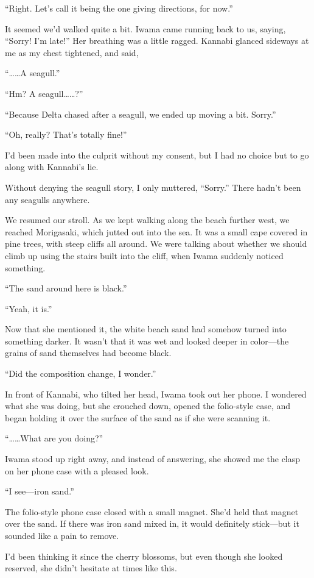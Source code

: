 \documentclass[
    a4paper,
    12pt,
    twoside,
    openany,
    UTF8,
    fontset=windows
]{ctexbook}
\begin{document}
``Right. Let's call it being the one giving directions, for now.''

It seemed we'd walked quite a bit. Iwama came running back to us, saying, ``Sorry! I'm late!'' Her breathing was a little ragged. Kannabi glanced sideways at me as my chest tightened, and said,

``\dots\dots A seagull.''

``Hm? A seagull\dots\dots?''

``Because Delta chased after a seagull, we ended up moving a bit. Sorry.''

``Oh, really? That's totally fine!''

I'd been made into the culprit without my consent, but I had no choice but to go along with Kannabi's lie.

Without denying the seagull story, I only muttered, ``Sorry.'' There hadn't been any seagulls anywhere.

We resumed our stroll. As we kept walking along the beach further west, we reached Morigasaki, which jutted out into the sea. It was a small cape covered in pine trees, with steep cliffs all around. We were talking about whether we should climb up using the stairs built into the cliff, when Iwama suddenly noticed something.

``The sand around here is black.''

``Yeah, it is.''

Now that she mentioned it, the white beach sand had somehow turned into something darker. It wasn't that it was wet and looked deeper in color---the grains of sand themselves had become black.

``Did the composition change, I wonder.''

In front of Kannabi, who tilted her head, Iwama took out her phone. I wondered what she was doing, but she crouched down, opened the folio-style case, and began holding it over the surface of the sand as if she were scanning it.

``\dots\dots What are you doing?''

Iwama stood up right away, and instead of answering, she showed me the clasp on her phone case with a pleased look.

``I see---iron sand.''

The folio-style phone case closed with a small magnet. She'd held that magnet over the sand. If there was iron sand mixed in, it would definitely stick---but it sounded like a pain to remove.

I'd been thinking it since the cherry blossoms, but even though she looked reserved, she didn't hesitate at times like this.
\end{document}
